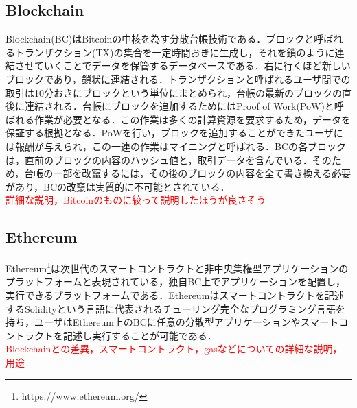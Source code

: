 \documentclass[japanese, macos]{KU2}
\begin{document}
\subsection{Blockchain}
Blockchain(BC)はBitcoin\cite{nakamoto2008bitcoin}の中核を為す分散台帳技術である．ブロックと呼ばれるトランザクション(TX)の集合を一定時間おきに生成し，それを鎖のように連結させていくことでデータを保管するデータベースである．右に行くほど新しいブロックであり，鎖状に連結される．トランザクションと呼ばれるユーザ間での取引は10分おきにブロックという単位にまとめられ，台帳の最新のブロックの直後に連結される．台帳にブロックを追加するためにはProof of Work(PoW)と呼ばれる作業が必要となる．この作業は多くの計算資源を要求するため，データを保証する根拠となる．PoWを行い，ブロックを追加することができたユーザには報酬が与えられ，この一連の作業はマイニングと呼ばれる．BCの各ブロックは，直前のブロックの内容のハッシュ値と，取引データを含んでいる．そのため，台帳の一部を改竄するには，その後のブロックの内容を全て書き換える必要があり，BCの改竄は実質的に不可能とされている．\\
\textcolor{red}{詳細な説明，Bitcoinのものに絞って説明したほうが良さそう}

\subsection{Ethereum}
Ethereum\footnote{https://www.ethereum.org/}は次世代のスマートコントラクトと非中央集権型アプリケーションのプラットフォームと表現されている，独自BC上でアプリケーションを配置し，実行できるプラットフォームである．Ethereumはスマートコントラクトを記述するSolidityという言語に代表されるチューリング完全なプログラミング言語を持ち，ユーザはEthereum上のBCに任意の分散型アプリケーションやスマートコントラクトを記述し実行することが可能である．\\
\textcolor{red}{Blockchainとの差異，スマートコントラクト，gasなどについての詳細な説明，用途}\\
\end{document}
